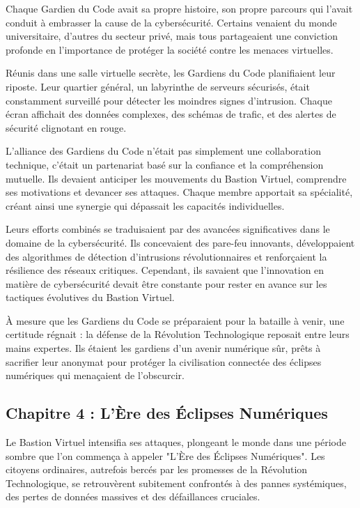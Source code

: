\documentclass{./StyCls/MyArticle}
\begin{document}
Chaque Gardien du Code avait sa propre histoire, son propre parcours qui l'avait conduit à embrasser la cause de la cybersécurité. Certains venaient du monde universitaire, d'autres du secteur privé, mais tous partageaient une conviction profonde en l'importance de protéger la société contre les menaces virtuelles.

Réunis dans une salle virtuelle secrète, les Gardiens du Code planifiaient leur riposte. Leur quartier général, un labyrinthe de serveurs sécurisés, était constamment surveillé pour détecter les moindres signes d'intrusion. Chaque écran affichait des données complexes, des schémas de trafic, et des alertes de sécurité clignotant en rouge.

L'alliance des Gardiens du Code n'était pas simplement une collaboration technique, c'était un partenariat basé sur la confiance et la compréhension mutuelle. Ils devaient anticiper les mouvements du Bastion Virtuel, comprendre ses motivations et devancer ses attaques. Chaque membre apportait sa spécialité, créant ainsi une synergie qui dépassait les capacités individuelles.

Leurs efforts combinés se traduisaient par des avancées significatives dans le domaine de la cybersécurité. Ils concevaient des pare-feu innovants, développaient des algorithmes de détection d'intrusions révolutionnaires et renforçaient la résilience des réseaux critiques. Cependant, ils savaient que l'innovation en matière de cybersécurité devait être constante pour rester en avance sur les tactiques évolutives du Bastion Virtuel.

À mesure que les Gardiens du Code se préparaient pour la bataille à venir, une certitude régnait : la défense de la Révolution Technologique reposait entre leurs mains expertes. Ils étaient les gardiens d'un avenir numérique sûr, prêts à sacrifier leur anonymat pour protéger la civilisation connectée des éclipses numériques qui menaçaient de l'obscurcir.


\subsection{Chapitre 4 : L'Ère des Éclipses Numériques}



Le Bastion Virtuel intensifia ses attaques, plongeant le monde dans une période sombre que l'on commença à appeler "L'Ère des Éclipses Numériques". Les citoyens ordinaires, autrefois bercés par les promesses de la Révolution Technologique, se retrouvèrent subitement confrontés à des pannes systémiques, des pertes de données massives et des défaillances cruciales.
\end{document}
